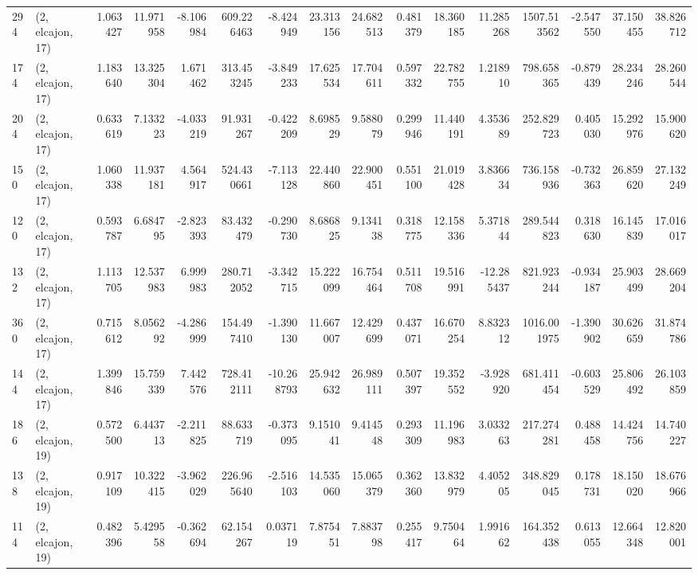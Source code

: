 \begin{tabular}{llrrrrrrrrrrrrrr}
294 &  (2, elcajon, 17) &   1.063427 &  11.971958 &  -8.106984 &   609.226463 &  -8.424949 &  23.313156 &  24.682513 &  0.481379 &  18.360185 &  11.285268 &   1507.513562 &   -2.547550 &   37.150455 &   38.826712 \\
174 &  (2, elcajon, 17) &   1.183640 &  13.325304 &   1.671462 &   313.453245 &  -3.849233 &  17.625534 &  17.704611 &  0.597332 &  22.782755 &   1.218910 &    798.658365 &   -0.879439 &   28.234246 &   28.260544 \\
204 &  (2, elcajon, 17) &   0.633619 &   7.133223 &  -4.033219 &    91.931267 &  -0.422209 &   8.698529 &   9.588079 &  0.299946 &  11.440191 &   4.353689 &    252.829723 &    0.405030 &   15.292976 &   15.900620 \\
150 &  (2, elcajon, 17) &   1.060338 &  11.937181 &   4.564917 &   524.430661 &  -7.113128 &  22.440860 &  22.900451 &  0.551100 &  21.019428 &   3.836634 &    736.158936 &   -0.732363 &   26.859620 &   27.132249 \\
120 &  (2, elcajon, 17) &   0.593787 &   6.684795 &  -2.823393 &    83.432479 &  -0.290730 &   8.686825 &   9.134138 &  0.318775 &  12.158336 &   5.371844 &    289.544823 &    0.318630 &   16.145839 &   17.016017 \\
132 &  (2, elcajon, 17) &   1.113705 &  12.537983 &   6.999983 &   280.712052 &  -3.342715 &  15.222099 &  16.754464 &  0.511708 &  19.516991 & -12.285437 &    821.923244 &   -0.934187 &   25.903499 &   28.669204 \\
360 &  (2, elcajon, 17) &   0.715612 &   8.056292 &  -4.286999 &   154.497410 &  -1.390130 &  11.667007 &  12.429699 &  0.437071 &  16.670254 &   8.832312 &   1016.001975 &   -1.390902 &   30.626659 &   31.874786 \\
144 &  (2, elcajon, 17) &   1.399846 &  15.759339 &   7.442576 &   728.412111 & -10.268793 &  25.942632 &  26.989111 &  0.507397 &  19.352552 &  -3.928920 &    681.411454 &   -0.603529 &   25.806492 &   26.103859 \\
186 &  (2, elcajon, 19) &   0.572500 &   6.443713 &  -2.211825 &    88.633719 &  -0.373095 &   9.151041 &   9.414548 &  0.293309 &  11.196983 &   3.033263 &    217.274281 &    0.488458 &   14.424756 &   14.740227 \\
138 &  (2, elcajon, 19) &   0.917109 &  10.322415 &  -3.962029 &   226.965640 &  -2.516103 &  14.535060 &  15.065379 &  0.362360 &  13.832979 &   4.405205 &    348.829045 &    0.178731 &   18.150020 &   18.676966 \\
114 &  (2, elcajon, 19) &   0.482396 &   5.429558 &  -0.362694 &    62.154267 &   0.037119 &   7.875451 &   7.883798 &  0.255417 &   9.750464 &   1.991662 &    164.352438 &    0.613055 &   12.664348 &   12.820001 \\

\end{tabular}
